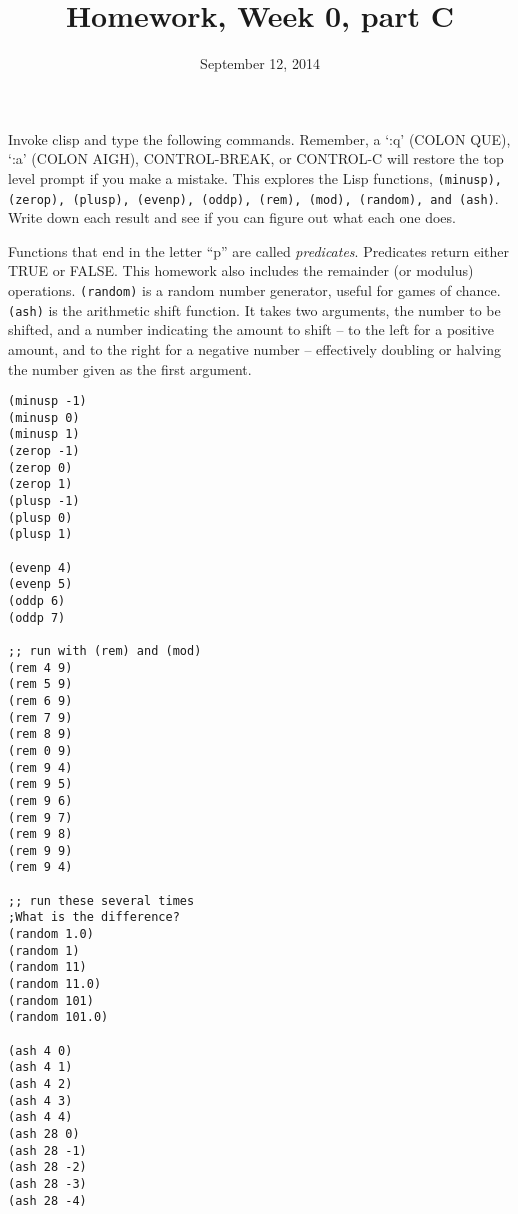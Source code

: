 \documentclass{article}
\title{Homework, Week 0, part C}
\date{September 12, 2014}
\begin{document}
\maketitle{}
\lstset{language=Lisp}

Invoke clisp and type the following commands. Remember, a `:q' (COLON QUE), `:a' (COLON AIGH), CONTROL-BREAK, or CONTROL-C will restore the top level prompt if you make a mistake. This explores the Lisp functions, \texttt{(minusp), (zerop), (plusp), (evenp), (oddp), (rem), (mod), (random), and (ash)}. Write down each result and see if you can figure out what each one does.

Functions that end in the letter ``p'' are called \textit{predicates}. Predicates return either TRUE or FALSE. This homework also includes the remainder (or modulus) operations. \texttt{(random)} is a random number generator, useful for games of chance. \texttt{(ash)} is the arithmetic shift function. It takes two arguments, the number to be shifted, and a number indicating the amount to shift -- to the left for a positive amount, and to the right for a negative number -- effectively doubling or halving the number given as the first argument.

\begin{multicols}{2}
\begin{lstlisting}
(minusp -1)
(minusp 0)
(minusp 1)
(zerop -1)
(zerop 0)
(zerop 1)
(plusp -1)
(plusp 0)
(plusp 1)

(evenp 4)
(evenp 5)
(oddp 6)
(oddp 7)

;; run with (rem) and (mod)
(rem 4 9)
(rem 5 9)
(rem 6 9)
(rem 7 9)
(rem 8 9)
(rem 0 9)
(rem 9 4)
(rem 9 5)
(rem 9 6)
(rem 9 7)
(rem 9 8)
(rem 9 9)
(rem 9 4)

;; run these several times
;What is the difference?
(random 1.0)
(random 1)
(random 11)
(random 11.0)
(random 101)
(random 101.0)

(ash 4 0)
(ash 4 1)
(ash 4 2)
(ash 4 3)
(ash 4 4)
(ash 28 0)
(ash 28 -1)
(ash 28 -2)
(ash 28 -3)
(ash 28 -4)
\end{lstlisting}
\end{multicols}
\end{document}
